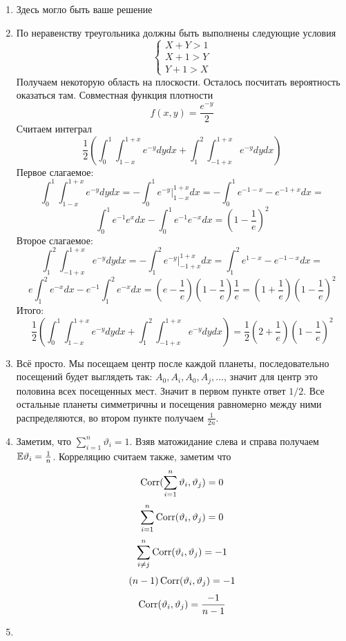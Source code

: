 \documentclass[12pt, a4paper]{article}\usepackage[]{graphicx}\usepackage[]{color}
\begin{document}
\begin{enumerate}
\item Здесь могло быть ваше решение
\item По неравенству треугольника должны быть выполнены следующие условия
\begin{equation}
\begin{cases}
X + Y > 1 \\
X + 1 > Y \\
Y  + 1 > X
\end{cases}
\end{equation}
Получаем некоторую область на плоскости. Осталось посчитать вероятность оказаться там. Совместная функция плотности
\[
f(x, y) = \frac{e^{-y}}{2}
\]
Считаем интеграл
\[
\frac{1}{2}\left(  \int_{0}^1 \int_{1 - x}^{1 + x} e^{-y} dy dx  + \int_{1}^2 \int_{-1 + x}^{1 + x}  e^{-y} dy dx  \right)
\]
Первое слагаемое:
\[
 \int_{0}^1 \int_{1 - x}^{1 + x} e^{-y} dy dx = - \int_{0}^1 e^{-y} |_{1 - x}^{1 + x} dx = - \int_{0}^1 e^{-1 - x} - e^{- 1 + x} dx =
\]
\[
\int_0^1 e^{-1} e^x dx - \int_{0}^1 e^{-1} e^{-x} dx = \left(1 -  \frac{1}{e}\right)^2
\]
Второе слагаемое:
\[
\int_{1}^2 \int_{-1 + x}^{1 + x}  e^{-y} dy dx = - \int_{1}^2 e^{-y} |_{-1 + x}^{1 + x} dx = \int_1^2 e^{1 - x} - e^{- 1 - x} dx =
\]
\[
e \int_1^2 e^{-x} dx - e^{-1} \int_1^2 e^{-x} dx = \left( e - \frac{1}{e}\right) \left( 1 - \frac{1}{e} \right) \frac{1}{e}  = \left( 1 + \frac{1}{e} \right) \left(1 -  \frac{1}{e}\right)^2
\]
Итого:
\[
\frac{1}{2}\left(  \int_{0}^1 \int_{1 - x}^{1 + x} e^{-y} dy dx  + \int_{1}^2 \int_{-1 + x}^{1 + x}  e^{-y} dy dx  \right) = \frac{1}{2}  \left( 2 + \frac{1}{e} \right) \left(1 -  \frac{1}{e}\right)^2
\]
\item Всё просто. Мы посещаем центр после каждой планеты, последовательно посещений будет выглядеть так: $A_0, A_i, A_0, A_j, \ldots$, значит для центр это половина всех посещенных мест. Значит в первом пункте ответ $1/2$. Все остальные планеты  симметричны и посещения равномерно между ними распределяются, во втором пункте получаем $\frac{1}{2n}$.
\item Заметим, что $\sum_{i = 1}^n \vartheta_i = 1$. Взяв матожидание слева и справа получаем $\mathbb{E} \vartheta_i = \frac{1}{n}$. Корреляцию считаем также, заметим что
\[
\operatorname{Corr} (\sum_{i = 1}^n \vartheta_i, \vartheta_j) = 0
\]
\[
\sum_{i = 1}^n \operatorname{Corr} (\vartheta_i, \vartheta_j) = 0
\]
\[
\sum_{i \neq j}^n \operatorname{Corr} (\vartheta_i, \vartheta_j) = -1
\]
\[
(n-1)  \operatorname{Corr} (\vartheta_i, \vartheta_j) = -1
\]
\[
 \operatorname{Corr} (\vartheta_i, \vartheta_j) = \frac{-1}{n-1}
\]
\item \[
\]
\end{enumerate}
\end{document}
